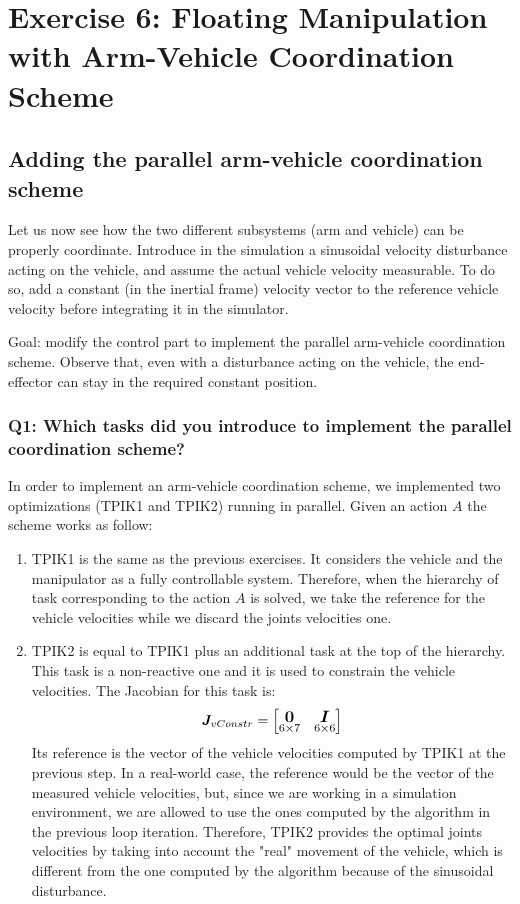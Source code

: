 \documentclass{article}
\begin{document}
\section{Exercise 6: Floating Manipulation with Arm-Vehicle Coordination Scheme}
\subsection{Adding the parallel arm-vehicle coordination scheme}
Let us now see how the two different subsystems (arm and vehicle) can be properly coordinate. Introduce in the simulation a sinusoidal velocity disturbance acting on the vehicle, and assume the actual vehicle velocity measurable. To do so, add a constant (in the inertial frame) velocity vector to the reference vehicle velocity before integrating it in the simulator. 

Goal: modify the control part to implement the parallel arm-vehicle coordination scheme. Observe that, even with a disturbance acting on the vehicle, the end-effector can stay in the required constant position.

\subsubsection{Q1: Which tasks did you introduce to implement the parallel coordination scheme?}
In order to implement an arm-vehicle coordination scheme, we implemented two optimizations (TPIK1 and TPIK2) running in parallel. Given an action $A$ the scheme works as follow:

\begin{enumerate}
\item TPIK1 is the same as the previous exercises. It considers the vehicle and the manipulator as a fully controllable system. Therefore, when the hierarchy of task corresponding to the action $A$ is solved, we take the reference for the vehicle velocities while we discard the joints velocities one.
\item TPIK2 is equal to TPIK1 plus an additional task at the top of the hierarchy. This task is a non-reactive one and it is used to constrain the vehicle velocities. The Jacobian for this task is:
\vspace{5px}
\begin{equation}
\large
\boldsymbol{J}_{vConstr}=
    \begin{bmatrix}
     \underset{6\times7}{\boldsymbol{0}} & \underset{6\times6}{\boldsymbol{I}} \\
    \end{bmatrix}
\end{equation}
Its reference is the vector of the vehicle velocities computed by TPIK1 at the previous step. In a real-world case, the reference would be the vector of the measured vehicle velocities, but, since we are working in a simulation environment, we are allowed to use the ones computed by the algorithm in the previous loop iteration.
Therefore, TPIK2 provides the optimal joints velocities by taking into account the "real" movement of the vehicle, which is different from the one computed by the algorithm because of the sinusoidal disturbance.
\end{enumerate}
\end{document}

